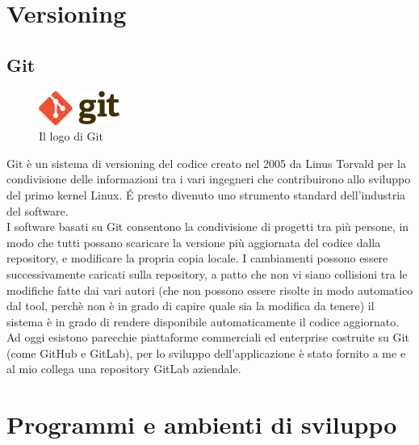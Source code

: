 \section{Versioning}

\subsection{Git}
\begin{figure}[h]
    \centering
    \includegraphics[width=100px]{./images/Git.png}
    \caption{Il logo di Git}
    \label{fig:Git}
\end{figure}
Git è un sistema di versioning del codice creato nel 2005 da Linus Torvald per la condivisione delle informazioni tra i vari ingegneri che contribuirono allo sviluppo del primo kernel Linux.\cite{GitHistory} \'E presto divenuto uno strumento standard dell'industria del software. 
\\
I software basati su Git consentono la condivisione di progetti tra più persone, in modo che tutti possano scaricare la versione più aggiornata del codice dalla repository, e modificare la propria copia locale. I cambiamenti possono essere successivamente caricati sulla repository, a patto che non vi siano collisioni tra le modifiche fatte dai vari autori (che non possono essere risolte in modo automatico dal tool, perchè non è in grado di capire quale sia la modifica da tenere) il sistema è in grado di rendere disponibile automaticamente il codice aggiornato.
\\
Ad oggi esistono parecchie piattaforme commerciali ed enterprise costruite su Git (come GitHub e GitLab), per lo sviluppo dell'applicazione è stato fornito a me e al mio collega una repository GitLab aziendale.



\section{Programmi e ambienti di sviluppo}


